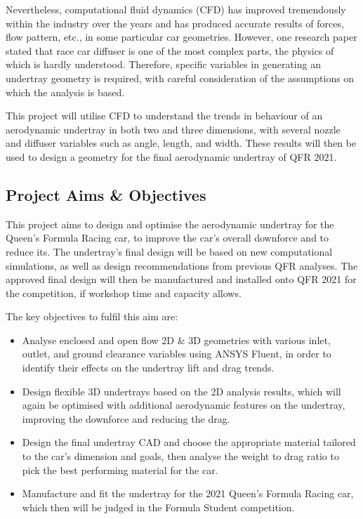 \noindent Nevertheless, computational fluid dynamics (CFD) has improved tremendously within the industry over the years and has produced accurate results of forces, flow pattern, etc., in some particular car geometries. However, one research paper \cite{Zhang2006GroundCars} stated that race car diffuser is one of the most complex parts, the physics of which is hardly understood. Therefore, specific variables in generating an undertray geometry is required, with careful consideration of the assumptions on which the analysis is based.

\noindent This project will utilise CFD to understand the trends in behaviour of an aerodynamic undertray in both two and three dimensions, with several nozzle and diffuser variables such as angle, length, and width. These results will then be used to design a geometry for the final aerodynamic undertray of QFR 2021.

\subsection{Project Aims \& Objectives}
This project aims to design and optimise the aerodynamic undertray for the Queen's Formula Racing car, to improve the car's overall downforce and to reduce its. The undertray's final design will be based on new computational simulations, as well as design recommendations from previous QFR analyses. The approved final design will then be manufactured and installed onto QFR 2021 for the competition, if workshop time and capacity allows.

\noindent
The key objectives to fulfil this aim are:
\begin{itemize}

    \item Analyse enclosed and open flow 2D \& 3D geometries with various inlet, outlet, and ground clearance variables using ANSYS Fluent, in order to identify their effects on the undertray lift and drag trends. 
    
    \item Design flexible 3D undertrays based on the 2D analysis results, which will again be optimised with additional aerodynamic features on the undertray, improving the downforce and reducing the drag.
    
	\item Design the final undertray CAD and choose the appropriate material tailored to the car’s dimension and goals, then analyse the weight to drag ratio to pick the best performing material for the car.
	
    \item Manufacture and fit the undertray for the 2021 Queen’s Formula Racing car, which then will be judged in the Formula Student competition.
\end{itemize}